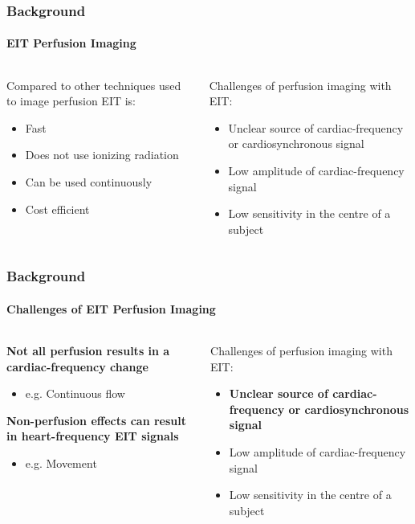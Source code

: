\documentclass[10pt,    %
    english,            %
    xcolor=table,       %
    envcountsect,        %
    aspectratio=1610
]{beamer}
\begin{document}
\begin{frame}
	\frametitle{Background}
	\framesubtitle{EIT Perfusion Imaging}
\begin{columns}[c]
\begin{column}{0.5\textwidth}
	Compared to other techniques used to image perfusion EIT is: \\ \vspace{2mm}
	\begin{itemize}
		\item Fast 
		\item Does not use ionizing radiation 
		\item Can be used continuously 
		\item Cost efficient 
	\end{itemize}
\end{column}
\begin{column}{0.5\textwidth}
	Challenges of perfusion imaging with EIT: \\ \vspace{5mm}
	\begin{itemize}
		\item Unclear source of cardiac-frequency or cardiosynchronous signal
		\item Low amplitude of cardiac-frequency signal
		\item Low sensitivity in the centre of a subject
	\end{itemize}
\end{column}
\end{columns}
\end{frame}

\begin{frame}
	\frametitle{Background}
	\framesubtitle{Challenges of EIT Perfusion Imaging}
\begin{columns}[c]
\begin{column}{0.5\textwidth}
\textbf{\large Not all perfusion results in a cardiac-frequency change}
\begin{itemize}
	\item e.g. Continuous flow
\end{itemize} %
\vspace{10mm}
\textbf{\large Non-perfusion effects can result in heart-frequency EIT signals}
\begin{itemize}
	\item e.g. Movement
\end{itemize}

\end{column}
\begin{column}{0.5\textwidth}
	Challenges of perfusion imaging with EIT: \\ \vspace{5mm}
	\begin{itemize}
		\item \textbf{Unclear source of cardiac-frequency or cardiosynchronous signal}
		\item Low amplitude of cardiac-frequency signal
		\item Low sensitivity in the centre of a subject
	\end{itemize}
\end{column}
\end{columns}
\end{frame}
\end{document}
